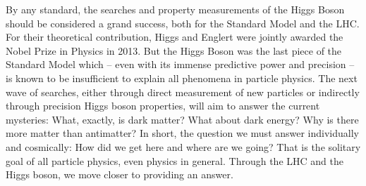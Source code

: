 By any standard, the searches and property measurements of the Higgs Boson should be considered a grand success, both for the Standard Model and the LHC. For their theoretical contribution, Higgs and Englert were jointly awarded the Nobel Prize in Physics in 2013. But the Higgs Boson was the last piece of the Standard Model which -- even with its immense predictive power and precision -- is known to be insufficient to explain all phenomena in particle physics. The next wave of searches, either through direct measurement of new particles or indirectly through precision Higgs boson properties, will aim to answer the current mysteries: What, exactly, is dark matter? What about dark energy? Why is there more matter than antimatter? In short, the question we must answer individually and cosmically: How did we get here and where are we going? That is the solitary goal of all particle physics, even physics in general. Through the LHC and the Higgs boson, we move closer to providing an answer.

